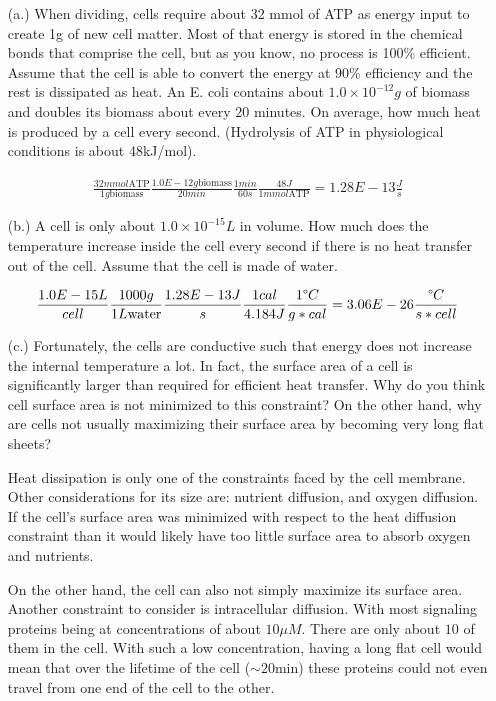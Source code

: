 \documentclass[11pt]{article}
\begin{document}
\begin{itemize}
\item[(a.)] When dividing, cells require about 32 mmol of ATP as energy input to create 1g of new cell matter. Most of that energy is stored in the chemical bonds that comprise the cell, but as you know, no process is 100\% efficient. Assume that the cell is able to convert the energy at 90\% efficiency and the rest is dissipated as heat. An E. coli contains about $1.0\times 10^{-12}g$ of biomass and doubles its biomass about every 20 minutes. On average, how much heat is produced by a cell every second. (Hydrolysis of ATP in physiological conditions is about 48kJ/mol).

\begin{equation*}
  \begin{aligned}
    \frac{32mmol\text{ATP}}{1g\text{biomass}}\frac{1.0E-12g\text{biomass}}{20min}\frac{1min}{60s}\frac{48J}{1mmol\text{ATP}}= 1.28E-13\frac{J}{s}
  \end{aligned}
\end{equation*}
\item[(b.)] A cell is only about $1.0\times 10^{-15}L$ in volume. How much does the temperature increase inside the cell every second if there is no heat transfer out of the cell. Assume that the cell is made of water. 

$$\frac{1.0E-15L}{cell}\frac{1000g}{1L\text{water}}\frac{1.28E-13J}{s}\frac{1cal}{4.184J}\frac{1\degree C}{g*cal}=3.06E-26\frac{\degree C}{s*cell}$$


\item[(c.)] Fortunately, the cells are conductive such that energy does not increase the internal temperature a lot. In fact, the surface area of a cell is significantly larger than required for efficient heat transfer. Why do you think cell surface area is not minimized to this constraint? On the other hand, why are cells not usually maximizing their surface area by becoming very long flat sheets?

Heat dissipation is only one of the constraints faced by the cell membrane. Other considerations for its size are: nutrient diffusion, and oxygen diffusion. If the cell's surface area was minimized with respect to the heat diffusion constraint than it would likely have too little surface area to absorb oxygen and nutrients. 

 On the other hand, the cell can also not simply maximize its surface area. Another constraint to consider is intracellular diffusion. With most signaling proteins being at concentrations of about $10\mu M$. There are only about $10$ of them in the cell. With such a low concentration, having a long flat cell would mean that over the lifetime of the cell ($\sim 20$min) these proteins could not even travel from one end of the cell to the other. 


\end{itemize}
\end{document}
